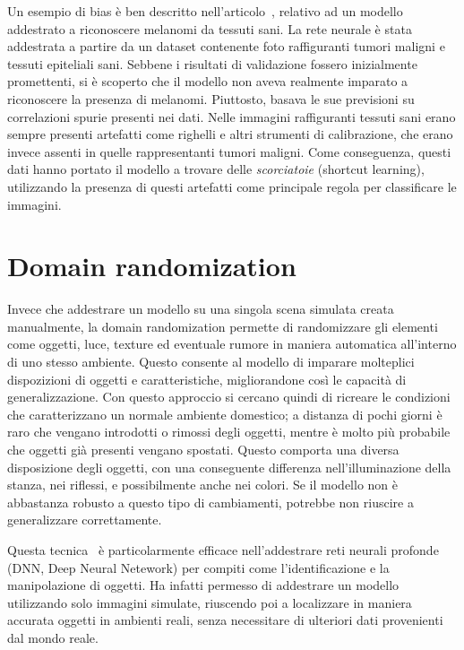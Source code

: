 \documentclass[12pt]{report}
\begin{document}
Un esempio di bias è ben descritto nell'articolo~\cite{diagnostics12010040}, relativo ad un modello addestrato a riconoscere melanomi da tessuti sani. La rete neurale è stata addestrata a partire da un dataset contenente foto raffiguranti tumori maligni e tessuti epiteliali sani. Sebbene i risultati di validazione fossero inizialmente promettenti, si è scoperto che il modello non aveva realmente imparato a riconoscere la presenza di melanomi. Piuttosto, basava le sue previsioni su correlazioni spurie presenti nei dati. Nelle immagini raffiguranti tessuti sani erano sempre presenti artefatti come righelli e altri strumenti di calibrazione, che erano invece assenti in quelle rappresentanti tumori maligni. Come conseguenza, questi dati hanno portato il modello a trovare delle \textit{scorciatoie} (shortcut learning), utilizzando la presenza di questi artefatti come principale regola per classificare le immagini.

\section{Domain randomization}
\label{sec:randomization}

Invece che addestrare un modello su una singola scena simulata creata manualmente, la domain randomization permette di randomizzare gli elementi come oggetti, luce, texture ed eventuale rumore in maniera automatica all'interno di uno stesso ambiente. Questo consente al modello di imparare molteplici dispozizioni di oggetti e caratteristiche, migliorandone così le capacità di generalizzazione. Con questo approccio si cercano quindi di ricreare le condizioni che caratterizzano un normale ambiente domestico; a distanza di pochi giorni è raro che vengano introdotti o rimossi degli oggetti, mentre è molto più probabile che oggetti già presenti vengano spostati. Questo comporta una diversa disposizione degli oggetti, con una conseguente differenza nell'illuminazione della stanza, nei riflessi, e possibilmente anche nei colori. Se il modello non è abbastanza robusto a questo tipo di cambiamenti, potrebbe non riuscire a generalizzare correttamente.

Questa tecnica~\cite{8202133} è particolarmente efficace nell'addestrare reti neurali profonde (DNN, Deep Neural Netework) per compiti come l'identificazione e la manipolazione di oggetti. Ha infatti permesso di addestrare un modello utilizzando solo immagini simulate, riuscendo poi a localizzare in maniera accurata oggetti in ambienti reali, senza necessitare di ulteriori dati provenienti dal mondo reale.
\end{document}
